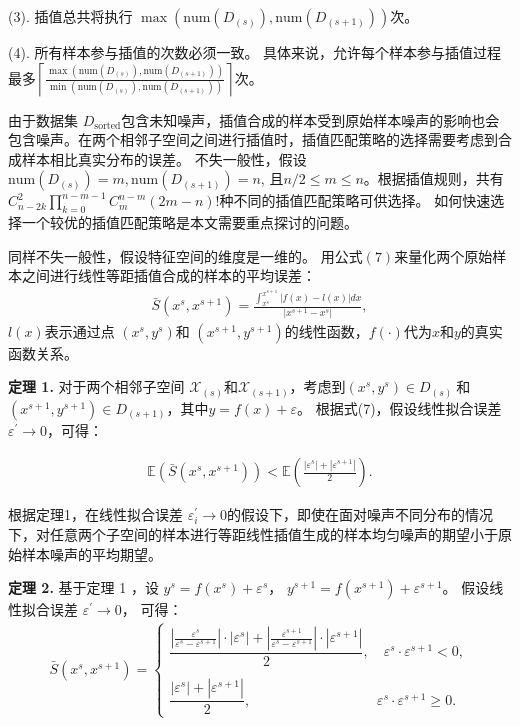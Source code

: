 \documentclass[12pt,a4paper]{article}%
\begin{document}
	(3). 插值总共将执行 $\max(\text{num}{(D_{(s)}),\text{num}(D_{(s+1)})})$次。

	(4). 所有样本参与插值的次数必须一致。 具体来说，允许每个样本参与插值过程最多$\left\lceil \frac{\max(\text{num}{(D_{(s)}),\text{num}(D_{( s+1)})})}{\min(\text{num}{(D_{(s)}),\text{num}(D_{(s+1)})})}\right\rceil $次。
	
	由于数据集 $D_{\text{sorted}}$包含未知噪声，插值合成的样本受到原始样本噪声的影响也会包含噪声。在两个相邻子空间之间进行插值时，插值匹配策略的选择需要考虑到合成样本相比真实分布的误差。
	不失一般性，假设 $\text{num}(D_{(s)})=m, \text{num}(D_{(s+1)})=n$, 且$n /2\le m \le n$。根据插值规则，共有 $C_{n-2k}^{2}\prod_{k=0}^{n-m-1} C_{m}^{n-m}(2m-n)!$种不同的插值匹配策略可供选择。
	如何快速选择一个较优的插值匹配策略是本文需要重点探讨的问题。
	
	同样不失一般性，假设特征空间的维度是一维的。 用公式$(7)$来量化两个原始样本之间进行线性等距插值合成的样本的平均误差：
	\begin{align} \bar{S}(x^s,x^{s+1})=\frac{\int_{x^s}^{x^{s+1}}|f(x)-l(x)|  dx}{|x^{s+1}-x^s|}, \end{align}
	 $l(x)$表示通过点 $(x^s,y^s)$和 $(x^{s+1},y^{s+1})$的线性函数，$f(\cdot)$代为$x$和$y$的真实函数关系。

	\textbf{定理 1.} 对于两个相邻子空间 $\mathcal{X}_{(s)}$和$\mathcal{X}_{(s+1)}$，考虑到$(x^s,y^s)\in D_{(s)}\ $和$(x^{s+1},y^{s+1})\in D_{(s+1)}$，其中$y=f(x)+\varepsilon$。 根据式(7)，假设线性拟合误差 $\varepsilon^\prime\rightarrow0$，可得： 
	
	\begin{align}
		\mathbb{E} (\bar{S}(x^s,x^{s+1}))< \mathbb{E}(\frac{|\varepsilon^s|+|\varepsilon^{s+1}|}{2}).
		\end{align}

		根据定理1，在线性拟合误差 $\varepsilon_i^\prime\rightarrow0 $的假设下，即使在面对噪声不同分布的情况下，对任意两个子空间的样本进行等距线性插值生成的样本均匀噪声的期望小于原始样本噪声的平均期望。

	\textbf{定理 2.} 基于定理 1 ，设 $y^s=f(x^s)+\varepsilon^s$， $y^{s+1}=f(x^{s+1 })+\varepsilon^{s+1}$。 假设线性拟合误差 $\varepsilon^\prime\rightarrow0$， 可得：
	\begin{align}
		\bar{
		S}(x^s,x^{s+1})= \begin{cases} 
		\dfrac{|\frac{\varepsilon^s}{\varepsilon^s-\varepsilon^{s+1}}|\cdot |\varepsilon^{s}|+|\frac{\varepsilon^{s+1}}{\varepsilon^s-\varepsilon^{s+1}}|\cdot|\varepsilon^{s+1}|}{2},\quad\varepsilon^s\cdot \varepsilon^{s+1}<0,
		\\
		\\
		\dfrac{|\varepsilon^s|+|\varepsilon^{s+1}|}{2}, \qquad\qquad\qquad\qquad\quad\varepsilon^s\cdot \varepsilon^{s+1}\ge0.
		\end{cases}
		\end{align}
		
\end{document}
